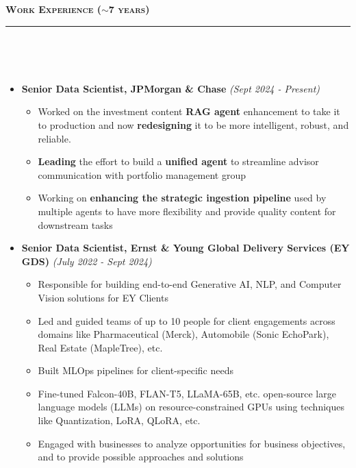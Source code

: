 \documentclass[a4paper,10pt]{article}
\newcommand{\isep}{-2 pt}
\newcommand{\lsep}{-0.5cm}
\newcommand{\resheading}[1]{{\small
        {
            \begin{minipage}
                {0.992\textwidth}\textbf{{\textsc{#1 \vphantom{p\^{E}} }}}
                \\[-0.3cm]
                \hrule
            \end{minipage}
            \\[-0.5cm]
        }
 }}
\begin{document}
\noindent
\resheading{\textbf{\large Work Experience ($\sim$7 years)}}\\[\lsep]
\begin{itemize}

    \item \textbf{Senior Data Scientist, JPMorgan \& Chase} \hfill {\emph{(Sept 2024 - Present)}}
    \\ [-0.6cm]
    \begin{itemize}\itemsep \isep
        \item Worked on the investment content \textbf{RAG agent} enhancement to take it to production and now \textbf{redesigning} it to be more intelligent, robust, and reliable. 
        \item \textbf{Leading} the effort to build a \textbf{unified agent} to streamline advisor communication with portfolio management group 
        \item Working on \textbf{enhancing the strategic ingestion pipeline} used by multiple agents to have more flexibility and provide quality content for downstream tasks
    \\ [-0.5cm]
    \end{itemize}

    \item \textbf{Senior Data Scientist, Ernst \& Young Global Delivery Services (EY GDS)} \hfill {\emph{(July 2022 - Sept 2024)}}
    \\ [-0.6cm]
    \begin{itemize}\itemsep \isep
        \item Responsible for building end-to-end Generative AI, NLP, and Computer Vision solutions for EY Clients
        \item Led and guided teams of up to 10 people for client engagements across domains like Pharmaceutical (Merck), Automobile (Sonic EchoPark), Real Estate (MapleTree), etc.
        \item Built MLOps pipelines for client-specific needs
        \item Fine-tuned Falcon-40B, FLAN-T5, LLaMA-65B, etc. open-source large language models (LLMs) on resource-constrained GPUs using techniques like Quantization, LoRA, QLoRA, etc.
        \item Engaged with businesses to analyze opportunities for business objectives, and to provide possible approaches and solutions
    \\ [-0.5cm]
    \end{itemize}
    

\end{itemize}
\end{document}
